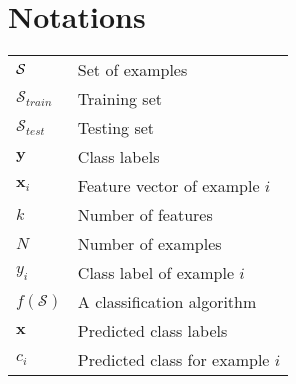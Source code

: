 
\chapter{Notations}
	
\begin{tabularx}{\textwidth}{ l X }
$\cal S$ 		& Set of examples 		\dotfill \pageref{ntn:ch2:1} \\ 
$\mathcal{S}_{train}$ 	& Training set	 		\dotfill \pageref{ntn:ch2:1} \\
$\mathcal{S}_{test}$ 	& Testing set	 		\dotfill \pageref{ntn:ch2:1} \\
$\mathbf{y}$ 		& Class labels 			\dotfill \pageref{ntn:ch2:1} \\  
$\mathbf{x}_i$ 		& Feature vector of example $i$ \dotfill \pageref{ntn:ch2:1} \\
$k$ 			& Number of features 		\dotfill \pageref{ntn:ch2:1} \\
$N $ 			& Number of examples 		\dotfill \pageref{ntn:ch2:1} \\
$y_i$ 			& Class label of example $i$ 	\dotfill \pageref{ntn:ch2:1} \\
$f(\mathcal{S})$ 	& A classification algorithm 	\dotfill \pageref{ntn:ch2:1} \\
$\mathbf{x}$ 		& Predicted class labels 	\dotfill \pageref{ntn:ch2:1} \\  
$c_i$ 			& Predicted class for example $i$  \dotfill \pageref{ntn:ch2:1} \\
\end{tabularx}

